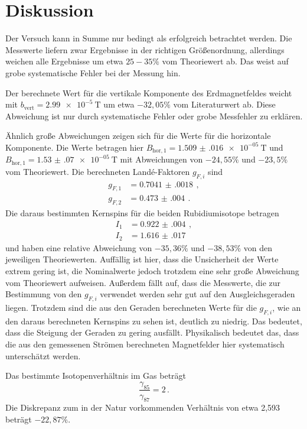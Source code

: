 \newpage
\section{Diskussion}
\label{sec:Diskussion}

Der Versuch kann in Summe nur bedingt als erfolgreich betrachtet werden. Die Messwerte
liefern zwar Ergebnisse in der richtigen Größenordnung, allerdings weichen alle Ergebnisse um
etwa $25-35\%$ vom Theoriewert ab. Das weist auf grobe systematische Fehler bei der Messung hin.

Der berechnete Wert für die vertikale Komponente des Erdmagnetfeldes weicht mit
$b_{\text{vert}}=\SI{2.99e-5}{\tesla}$ um etwa $-32{,}05\%$ vom Literaturwert ab. Diese Abweichung
ist nur durch systematische Fehler oder grobe Messfehler zu erklären.

Ähnlich große Abweichungen zeigen sich für die Werte für die horizontale Komponente.
Die Werte betragen hier $B_{\text{hor},1}=\SI{1.509(016)e-05}{\tesla}$ und
$B_{\text{hor},1}=\SI{1.53(07)e-05}{\tesla}$ mit Abweichungen von $-24{,}55\%$ und $-23{,}5\%$
vom Theoriewert. Die berechneten Landé-Faktoren $g_{F,i}$ sind
\begin{align*}
  g_{F,1}&= \SI{0.7041(0018)}{}\,,\\
  g_{F,2}&= \SI{0.473(004)}{}\,.
\end{align*}
Die daraus bestimmten Kernspins für die beiden Rubidiumisotope betragen
\begin{align*}
  I_1&= \SI{0.922(004)}{}\,,\\
  I_2&= \SI{1.616(017)}{}
\end{align*}
und haben eine relative Abweichung von $-35{,}36\%$ und $-38{,}53\%$ von den jeweiligen
Theoriewerten. Auffällig ist hier, dass die Unsicherheit der Werte extrem gering ist,
die Nominalwerte jedoch trotzdem eine sehr große Abweichung vom Theoriewert aufweisen.
Außerdem fällt auf, dass die Messwerte, die zur Bestimmung von den $g_{F,i}$ verwendet werden
sehr gut auf den Ausgleichsgeraden liegen. Trotzdem sind die aus den Geraden berechneten Werte
für die $g_{F,i}$, wie an den daraus berechneten Kernspins zu sehen ist, deutlich zu niedrig.
Das bedeutet, dass die Steigung der Geraden zu gering ausfällt. Physikalisch bedeutet das, dass
die aus den gemessenen Strömen berechneten Magnetfelder hier systematisch unterschätzt werden. 

Das bestimmte Isotopenverhältnis im Gas beträgt
\begin{equation}
  \frac{\gamma_{85}}{\gamma_{87}}= 2 \,.
\end{equation}
Die Diskrepanz zum in der Natur vorkommenden Verhältnis von
etwa 2{,}593 beträgt $-22{,}87\%$.

